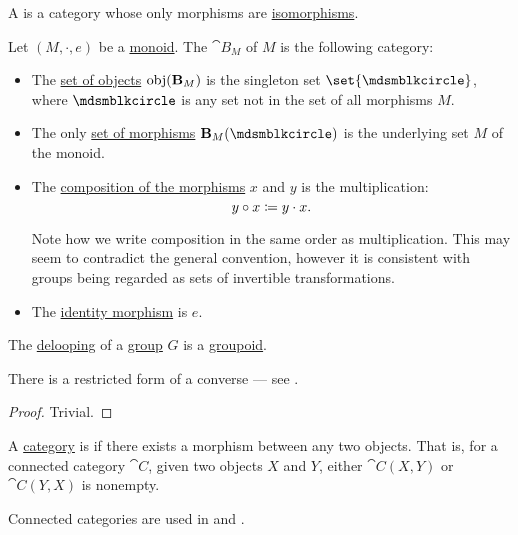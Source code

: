 \begin{definition}\label{def:groupoid}
  A  is a category whose only morphisms are \hyperref[def:morphism_invertibility/isomorphism]{isomorphisms}.
\end{definition}

\begin{definition}\label{def:monoid_delooping}
  Let \( (M, \cdot, e) \) be a \hyperref[def:unital_magma/monoid]{monoid}. The  \( \cat{B}_M \) of \( M \) is the following category:
  \begin{itemize}
    \item The \hyperref[def:category/objects]{set of objects} \( \operatorname{obj}(\operatorname{\mathbf{B}}_M) \) is the singleton set \( \set{ \Anon } \), where \( \Anon \) is any set not in the set of all morphisms \( M \).

    \item The only \hyperref[def:category/morphisms]{set of morphisms} \( \cat{B}_M(\Anon) \) is the underlying set \( M \) of the monoid.

    \item The \hyperref[def:category/composition]{composition of the morphisms} \( x \) and \( y \) is the multiplication:
    \begin{equation*}
      y \bincirc x \coloneqq y \cdot x.
    \end{equation*}

    Note how we write composition in the same order as multiplication. This may seem to contradict the general convention, however it is consistent with groups being regarded as sets of invertible transformations.

    \item The \hyperref[def:category/identity]{identity morphism} is \( e \).
  \end{itemize}
\end{definition}

\begin{proposition}\label{thm:delooping_of_group}
  The \hyperref[def:monoid_delooping]{delooping} of a \hyperref[def:group]{group} \( G \) is a \hyperref[def:groupoid]{groupoid}.

  There is a restricted form of a converse --- see .
\end{proposition}
\begin{proof}
  Trivial.
\end{proof}

\begin{definition}\label{def:connected_category}
  A \hyperref[def:category]{category} is  if there exists a morphism between any two objects. That is, for a connected category \( \cat{C} \), given two objects \( X \) and \( Y \), either \( \cat{C}(X, Y) \) or \( \cat{C}(Y, X) \) is nonempty.

  Connected categories are used in  and .
\end{definition}

